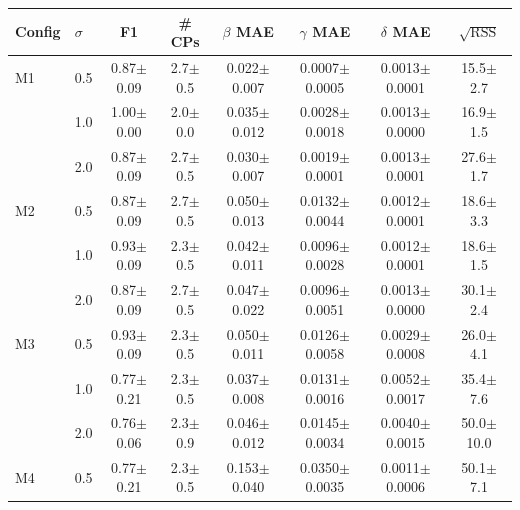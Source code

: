 \begin{tabular}{llcccccc}
\hline
Config & $\sigma$ & F1 & \# CPs & $\beta$ MAE & $\gamma$ MAE & $\delta$ MAE & $\sqrt{\mathrm{RSS}}$ \\
\hline
M1 & 0.5 & \cellcolor{goodgreen}0.87$\pm$0.09 & \cellcolor{warnorange}2.7$\pm$0.5 & \cellcolor{goodgreen}0.022$\pm$0.007 & \cellcolor{goodgreen}0.0007$\pm$0.0005 & \cellcolor{goodgreen}0.0013$\pm$0.0001 & 15.5$\pm$2.7 \\
 & 1.0 & \cellcolor{goodgreen}1.00$\pm$0.00 & \cellcolor{goodgreen}2.0$\pm$0.0 & \cellcolor{warnorange}0.035$\pm$0.012 & \cellcolor{goodgreen}0.0028$\pm$0.0018 & \cellcolor{goodgreen}0.0013$\pm$0.0000 & 16.9$\pm$1.5 \\
 & 2.0 & \cellcolor{goodgreen}0.87$\pm$0.09 & \cellcolor{warnorange}2.7$\pm$0.5 & \cellcolor{goodgreen}0.030$\pm$0.007 & \cellcolor{goodgreen}0.0019$\pm$0.0001 & \cellcolor{goodgreen}0.0013$\pm$0.0001 & 27.6$\pm$1.7 \\
\hline
M2 & 0.5 & \cellcolor{warnorange}0.87$\pm$0.09 & \cellcolor{warnorange}2.7$\pm$0.5 & \cellcolor{warnorange}0.050$\pm$0.013 & \cellcolor{goodgreen}0.0132$\pm$0.0044 & \cellcolor{goodgreen}0.0012$\pm$0.0001 & 18.6$\pm$3.3 \\
 & 1.0 & \cellcolor{warnorange}0.93$\pm$0.09 & \cellcolor{goodgreen}2.3$\pm$0.5 & \cellcolor{goodgreen}0.042$\pm$0.011 & \cellcolor{goodgreen}0.0096$\pm$0.0028 & \cellcolor{goodgreen}0.0012$\pm$0.0001 & 18.6$\pm$1.5 \\
 & 2.0 & \cellcolor{goodgreen}0.87$\pm$0.09 & \cellcolor{warnorange}2.7$\pm$0.5 & \cellcolor{warnorange}0.047$\pm$0.022 & \cellcolor{goodgreen}0.0096$\pm$0.0051 & \cellcolor{goodgreen}0.0013$\pm$0.0000 & 30.1$\pm$2.4 \\
\hline
M3 & 0.5 & \cellcolor{warnorange}0.93$\pm$0.09 & \cellcolor{goodgreen}2.3$\pm$0.5 & \cellcolor{warnorange}0.050$\pm$0.011 & \cellcolor{goodgreen}0.0126$\pm$0.0058 & \cellcolor{goodgreen}0.0029$\pm$0.0008 & 26.0$\pm$4.1 \\
 & 1.0 & \cellcolor{warnorange}0.77$\pm$0.21 & \cellcolor{warnorange}2.3$\pm$0.5 & \cellcolor{warnorange}0.037$\pm$0.008 & \cellcolor{goodgreen}0.0131$\pm$0.0016 & \cellcolor{goodgreen}0.0052$\pm$0.0017 & 35.4$\pm$7.6 \\
 & 2.0 & \cellcolor{warnorange}0.76$\pm$0.06 & \cellcolor{goodgreen}2.3$\pm$0.9 & \cellcolor{goodgreen}0.046$\pm$0.012 & \cellcolor{goodgreen}0.0145$\pm$0.0034 & \cellcolor{goodgreen}0.0040$\pm$0.0015 & 50.0$\pm$10.0 \\
\hline
M4 & 0.5 & \cellcolor{goodgreen}0.77$\pm$0.21 & \cellcolor{goodgreen}2.3$\pm$0.5 & \cellcolor{goodgreen}0.153$\pm$0.040 & \cellcolor{warnorange}0.0350$\pm$0.0035 & \cellcolor{goodgreen}0.0011$\pm$0.0006 & 50.1$\pm$7.1 \\

\end{tabular}
